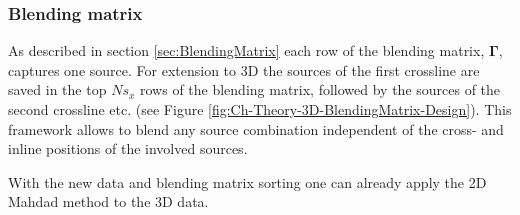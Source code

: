 \subsubsection*{Blending matrix}

As described in section \ref{sec:BlendingMatrix} each row of the blending matrix, $\mathbf{\Gamma}$, captures one source. For extension to 3D the sources of the first crossline are saved in the top $Ns_x$ rows of the blending matrix, followed by the sources of the second crossline etc. (see Figure \ref{fig:Ch-Theory-3D-BlendingMatrix-Design}). This framework allows to blend any source combination independent of the cross- and inline positions of the involved sources.

With the new data and blending matrix sorting one can already apply the 2D Mahdad method to the 3D data.


